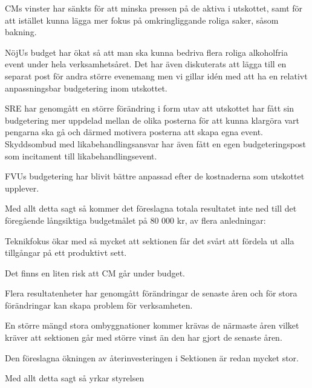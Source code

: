 \documentclass[../_main/handlingar.tex]{subfiles}
\begin{document}
CMs vinster har sänkts för att minska pressen på de aktiva i utskottet, samt för att istället kunna lägga mer fokus på omkringliggande roliga saker, såsom bakning.

NöjUs budget har ökat så att man ska kunna bedriva flera roliga alkoholfria event under hela verksamhetsåret. Det har även diskuterats att lägga till en separat post för andra större evenemang men vi gillar idén med att ha en relativt anpassningsbar budgetering inom utskottet.

SRE har genomgått en större förändring i form utav att utskottet har fått sin budgetering mer uppdelad mellan de olika posterna för att kunna klargöra vart pengarna ska gå och därmed motivera posterna att skapa egna event. 
Skyddsombud med likabehandlingsansvar har även fått en egen budgeteringspost som incitament till likabehandlingsevent.

FVUs budgetering har blivit bättre anpassad efter de kostnaderna som utskottet upplever.

\newpage

Med allt detta sagt så kommer det föreslagna totala resultatet inte ned till det föregående långsiktiga budgetmålet på 80 000 kr, av flera anledningar: 

\begin{tightdashlist}
    \item Teknikfokus ökar med så mycket att sektionen får det svårt att fördela ut alla tillgångar på ett produktivt sett.
    \item Det finns en liten risk att CM går under budget.
    \item Flera resultatenheter har genomgått förändringar de senaste åren och för stora förändringar kan skapa problem för verksamheten.
    \item En större mängd stora ombyggnationer kommer krävas de närmaste åren vilket kräver att sektionen går med större vinst än den har gjort de senaste åren.
    \item Den föreslagna ökningen av återinvesteringen i Sektionen är redan mycket stor.
\end{tightdashlist}

Med allt detta sagt så yrkar styrelsen
\end{document}
